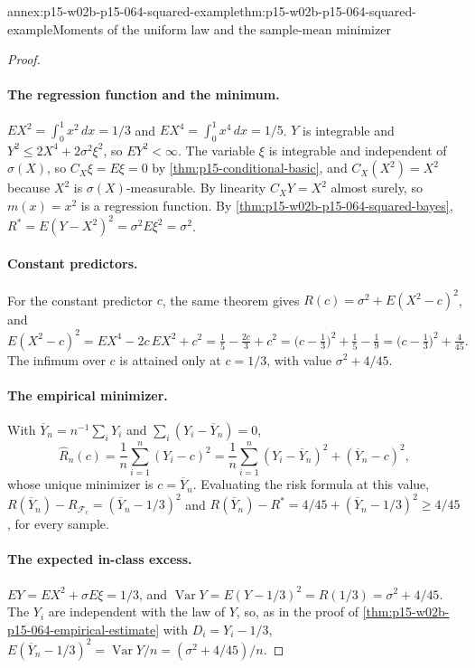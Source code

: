 \begin{annexitem}{annex:p15-w02b-p15-064-squared-example}{thm:p15-w02b-p15-064-squared-example}{Moments of the uniform law and the sample-mean minimizer}
\begin{proof}
\paragraph{The regression function and the minimum.}
\(EX^2=\int_0^1x^2\,dx=1/3\) and \(EX^4=\int_0^1x^4\,dx=1/5\). \(Y\) is
integrable and \(Y^2\leq2X^4+2\sigma^2\xi^2\), so \(EY^2<\infty\). The
variable \(\xi\) is integrable and independent of \(\sigma(X)\), so
\(C_X\xi=E\xi=0\) by \cref{thm:p15-conditional-basic}, and \(C_X(X^2)=X^2\)
because \(X^2\) is \(\sigma(X)\)-measurable. By linearity
\(C_XY=X^2\) almost surely, so \(m(x)=x^2\) is a regression function. By
\cref{thm:p15-w02b-p15-064-squared-bayes},
\(R^{*}=E(Y-X^2)^2=\sigma^2E\xi^2=\sigma^2\).

\paragraph{Constant predictors.}
For the constant predictor \(c\), the same theorem gives
\(R(c)=\sigma^2+E(X^2-c)^2\), and
\[
 E(X^2-c)^2=EX^4-2c\,EX^2+c^2=\tfrac15-\tfrac{2c}3+c^2
 =\bigl(c-\tfrac13\bigr)^2+\tfrac15-\tfrac19
 =\bigl(c-\tfrac13\bigr)^2+\tfrac4{45}.
\]
The infimum over \(c\) is attained only at \(c=1/3\), with value
\(\sigma^2+4/45\).

\paragraph{The empirical minimizer.}
With \(\overline Y_n=n^{-1}\sum_iY_i\) and
\(\sum_i(Y_i-\overline Y_n)=0\),
\[
 \widehat R_n(c)=\frac1n\sum_{i=1}^n(Y_i-c)^2
 =\frac1n\sum_{i=1}^n(Y_i-\overline Y_n)^2+(\overline Y_n-c)^2,
\]
whose unique minimizer is \(c=\overline Y_n\). Evaluating the risk formula at
this value, \(R(\overline Y_n)-R_{\mathcal F_c}=(\overline Y_n-1/3)^2\) and
\(R(\overline Y_n)-R^{*}=4/45+(\overline Y_n-1/3)^2\geq4/45\), for every
sample.

\paragraph{The expected in-class excess.}
\(EY=EX^2+\sigma E\xi=1/3\), and \(\operatorname{Var}Y=E(Y-1/3)^2=R(1/3)
=\sigma^2+4/45\). The \(Y_i\) are independent with the law of \(Y\), so, as
in the proof of \cref{thm:p15-w02b-p15-064-empirical-estimate} with
\(D_i=Y_i-1/3\),
\(E(\overline Y_n-1/3)^2=\operatorname{Var}Y/n=(\sigma^2+4/45)/n\).
\end{proof}
\end{annexitem}

